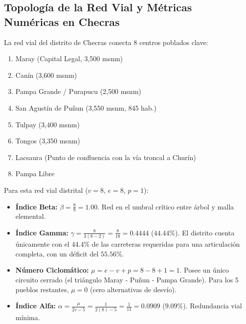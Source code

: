 \documentclass[11pt,a4paper]{article}
\begin{document}
\subsection{Topología de la Red Vial y Métricas Numéricas en Checras}
La red vial del distrito de Checras conecta 8 centros poblados clave:
\begin{enumerate}
    \item Maray (Capital Legal, 3,500 msnm)
    \item Canín (3,600 msnm)
    \item Pampa Grande / Purapucu (2,500 msnm)
    \item San Agustín de Puñun (3,550 msnm, 845 hab.)
    \item Tulpay (3,400 msnm)
    \item Tongos (3,350 msnm)
    \item Lacsaura (Punto de confluencia con la vía troncal a Churín)
    \item Pampa Libre
\end{enumerate}

Para esta red vial distrital ($v = 8$, $e = 8$, $p = 1$):
\begin{itemize}
    \item \textbf{Índice Beta:} $\beta = \frac{8}{8} = 1.00$. Red en el umbral crítico entre árbol y malla elemental.
    \item \textbf{Índice Gamma:} $\gamma = \frac{8}{3(8 - 2)} = \frac{8}{18} = 0.4444$ ($44.44\%$). El distrito cuenta únicamente con el 44.4\% de las carreteras requeridas para una articulación completa, con un déficit del $55.56\%$.
    \item \textbf{Número Ciclomático:} $\mu = e - v + p = 8 - 8 + 1 = 1$. Posee un único circuito cerrado (el triángulo Maray - Puñun - Pampa Grande). Para los 5 pueblos restantes, $\mu = 0$ (cero alternativas de desvío).
    \item \textbf{Índice Alfa:} $\alpha = \frac{\mu}{2v - 5} = \frac{1}{2(8) - 5} = \frac{1}{11} = 0.0909$ ($9.09\%$). Redundancia vial mínima.
\end{itemize}
\end{document}
